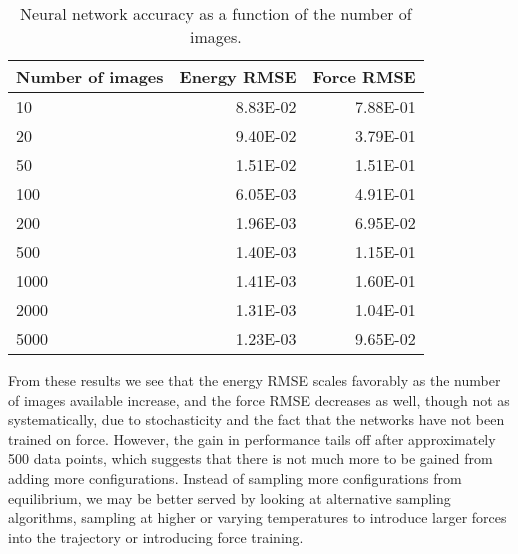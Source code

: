 \begin{table}[H]
\centering
\begin{tabular}{lrr}
\toprule
Number of images &  Energy RMSE &  Force RMSE \\
\midrule
             10 &     8.83E-02 &    7.88E-01 \\
             20 &     9.40E-02 &    3.79E-01 \\
             50 &     1.51E-02 &    1.51E-01 \\
            100 &     6.05E-03 &    4.91E-01 \\
            200 &     1.96E-03 &    6.95E-02 \\
            500 &     1.40E-03 &    1.15E-01 \\
           1000 &     1.41E-03 &    1.60E-01 \\
           2000 &     1.31E-03 &    1.04E-01 \\
           5000 &     1.23E-03 &    9.65E-02 \\
\bottomrule
\end{tabular}
    \caption{Neural network accuracy as a function
        of the number of images.}
    \label{table:images}
\end{table}

From these results we see that the energy RMSE scales favorably as
the number of images available increase, and the force RMSE decreases
as well, though not as systematically, due to stochasticity and
the fact that the networks have not been trained on force.
However, the gain in performance tails off after approximately 500 data points,
which suggests that there is not much more to be gained from
adding more configurations.
Instead of sampling more configurations from equilibrium, we may
be better served by looking at alternative sampling algorithms,
sampling at higher or varying temperatures to introduce larger
forces into the trajectory or introducing force training.

